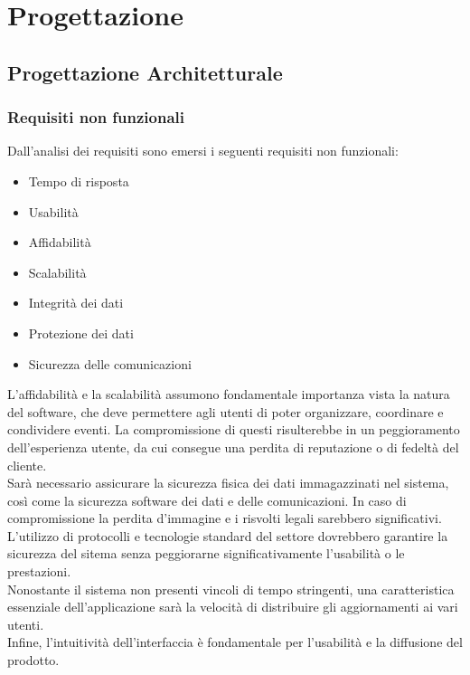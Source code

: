 \newpage
\section{Progettazione}

\subsection{Progettazione Architetturale}

\subsubsection{Requisiti non funzionali}

Dall'analisi dei requisiti sono emersi i seguenti requisiti non funzionali:
\begin{itemize}
    \item Tempo di risposta
    \item Usabilità
    \item Affidabilità
    \item Scalabilità
    \item Integrità dei dati
    \item Protezione dei dati
    \item Sicurezza delle comunicazioni
\end{itemize}

L'affidabilità e la scalabilità assumono fondamentale importanza vista la natura del software,
che deve permettere agli utenti di poter organizzare, coordinare e condividere eventi.
La compromissione di questi risulterebbe in un peggioramento dell'esperienza utente, da cui consegue una perdita di reputazione o di fedeltà del cliente.\\
Sarà necessario assicurare la sicurezza fisica dei dati immagazzinati nel sistema, così come la sicurezza software dei dati e delle comunicazioni.
In caso di compromissione la perdita d'immagine e i risvolti legali sarebbero significativi.
L'utilizzo di protocolli e tecnologie standard del settore dovrebbero garantire la sicurezza del sitema senza peggiorarne significativamente l'usabilità o le prestazioni.\\
Nonostante il sistema non presenti vincoli di tempo stringenti, una caratteristica essenziale dell'applicazione sarà la velocità di distribuire gli aggiornamenti ai vari utenti.\\
Infine, l'intuitività dell'interfaccia è fondamentale per l'usabilità e la diffusione del prodotto.

